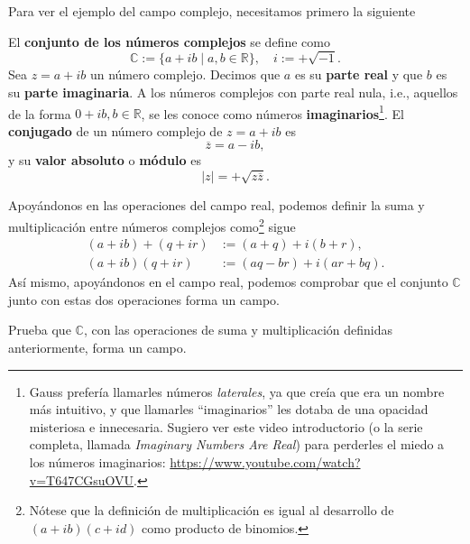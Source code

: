 \documentclass[notasLineal]{subfiles}
\begin{document}
Para ver el ejemplo del campo complejo, necesitamos primero la siguiente

\begin{tcolorbox}[breakable]
    \begin{Def}\label{Def: C}
    
        El \textbf{conjunto de los números complejos} se define como
        \[
        \mathbb{C} := \{a+ib\mid a,b\in\mathbb{R}\}, \quad i := +\sqrt{-1}.
        \]
        \noindent Sea $z=a+ib$ un número complejo. Decimos que $a$ es su \textbf{parte real} y que $b$ es su \textbf{parte imaginaria}. A los números complejos con parte real nula, i.e., aquellos de la forma $0+ib, b\in\mathbb{R}$, se les conoce como números \textbf{imaginarios}\footnote{Gauss prefería llamarles números \emph{laterales}, ya que creía que era un nombre más intuitivo, y que llamarles ``imaginarios'' les dotaba de una opacidad misteriosa e innecesaria. Sugiero ver este video introductorio (o la serie completa, llamada \emph{Imaginary Numbers Are Real}) para perderles el miedo a los números imaginarios: \url{https://www.youtube.com/watch?v=T647CGsuOVU}.}. El \textbf{conjugado} de un número complejo de $z=a+ib$ es
        \[
        \overline{z} = a-ib,
        \]
        y su \textbf{valor absoluto} o \textbf{módulo} es
        \[
        |z| = +\sqrt{z \overline{z}}.
        \]
    \end{Def}
\end{tcolorbox}    

\begin{Ejem}\label{Ejem: Campo complejo}
Apoyándonos en las operaciones del campo real, podemos definir la suma y multiplicación entre números complejos como\footnote{Nótese que la definición de multiplicación es igual al desarrollo de $(a+ib)(c+id)$ como producto de binomios.} sigue
\begin{align*}
    (a+ib)+(q+ir) &:=(a+q) + i(b+r), \\
    (a+ib)(q+ir)  &:= (aq-br) + i(ar+bq).
\end{align*}
 Así mismo, apoyándonos en el campo real, podemos comprobar que el conjunto $\mathbb{C}$ junto con estas dos operaciones forma un campo. 
\end{Ejem}

\begin{Ejer}\label{ejercicio-3}
    Prueba que $\mathbb{C}$, con las operaciones de suma y multiplicación definidas anteriormente, forma un campo.
\end{Ejer}
\end{document}
